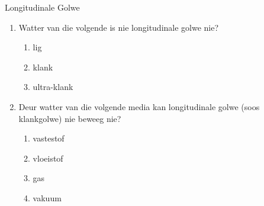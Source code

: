 \begin{eocexercises}{Longitudinale Golwe}
            \nopagebreak
      \label{m38783*id293753}\begin{enumerate}[noitemsep, label=\textbf{\arabic*}. ] 
            \label{m38783*uid27}\item Watter van die volgende is nie longitudinale golwe nie?
\label{m38783*id293768}\begin{enumerate}[noitemsep, label=\textbf{\alph*}. ] 
\label{m38783*uid29}\item lig
\label{m38783*uid30}\item klank
\label{m38783*uid31}\item ultra-klank
\end{enumerate}
                \label{m38783*uid32}\item Deur watter van die volgende media kan longitudinale golwe (soos klankgolwe) nie beweeg nie?
\label{m38783*id293834}\begin{enumerate}[noitemsep, label=\textbf{\alph*}. ] 
            \label{m38783*uid33}\item vastestof
\label{m38783*uid34}\item vloeistof
\label{m38783*uid35}\item gas
\label{m38783*uid36}\item vakuum
\end{enumerate}
                

\end{enumerate}
\end{eocexercises}
